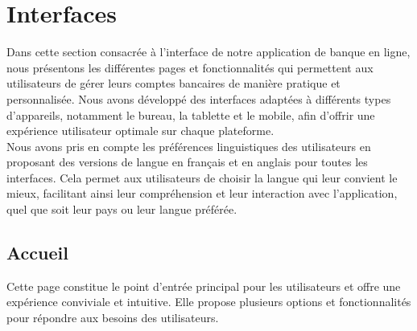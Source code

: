 \section{Interfaces}
Dans cette section consacrée à l'interface de notre application de banque en ligne, nous présentons les différentes pages et fonctionnalités qui permettent aux utilisateurs de gérer leurs comptes bancaires de manière pratique et personnalisée. Nous avons développé des interfaces adaptées à différents types d'appareils, notamment le bureau, la tablette et le mobile, afin d'offrir une expérience utilisateur optimale sur chaque plateforme.\\

Nous avons pris en compte les préférences linguistiques des utilisateurs en proposant des versions de langue en français et en anglais pour toutes les interfaces. Cela permet aux utilisateurs de choisir la langue qui leur convient le mieux, facilitant ainsi leur compréhension et leur interaction avec l'application, quel que soit leur pays ou leur langue préférée.
\subsection{Accueil}
Cette page constitue le point d'entrée principal pour les utilisateurs et offre une expérience conviviale et intuitive. Elle propose plusieurs options et fonctionnalités pour répondre aux besoins des utilisateurs.\\

